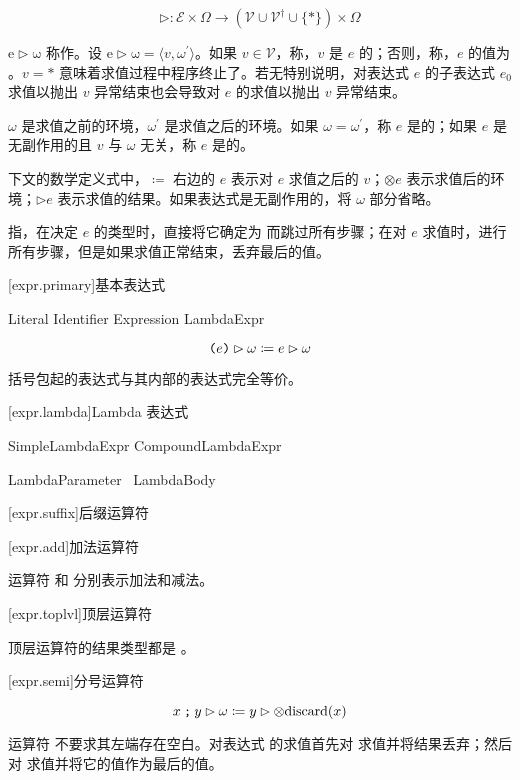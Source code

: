 $$ \mathrm{\rhd}: \mathcal{E} \times \Omega \rightarrow (\mathcal{V} \cup \mathcal{V}^\dag \cup \{\ast\}) \times \Omega $$

\pnum
$\mathrm{e \rhd \omega}$ 称作。设 $\mathrm{e \rhd \omega} = \langle v, \omega^\prime \rangle$。如果 $v \in \mathcal{V}$，称，$v$ 是 $e$ 的；否则，称，$e$ 的值为 。$v = \ast$ 意味着求值过程中程序终止了。若无特别说明，对表达式 $e$ 的子表达式 $e_0$ 求值以抛出 $v$ 异常结束也会导致对 $e$ 的求值以抛出 $v$ 异常结束。

\pnum
$\omega$ 是求值之前的环境，$\omega^\prime$ 是求值之后的环境。如果 $\omega = \omega^\prime$，称 $e$ 是的；如果 $e$ 是无副作用的且 $v$ 与 $\omega$ 无关，称 $e$ 是的。

\pnum
下文的数学定义式中，$\coloneqq$ 右边的 $e$ 表示对 $e$ 求值之后的 $v$；$\otimes e$ 表示求值后的环境；$\rhd e$ 表示求值的结果。如果表达式是无副作用的，将 $\omega$ 部分省略。

\pnum
{}指，在决定 $e$ 的类型时，直接将它确定为  而跳过所有步骤；在对 $e$ 求值时，进行所有步骤，但是如果求值正常结束，丢弃最后的值。

[expr.primary]{基本表达式}

\begin{bnf}
 \br
    Literal \br
    Identifier \br
    \terminal{(} Expression \terminal{)} \br
    LambdaExpr
\end{bnf}

$$ \texttt{(}e\texttt{)} \rhd \omega \coloneqq e \rhd \omega $$

\pnum
括号包起的表达式与其内部的表达式完全等价。

[expr.lambda]{Lambda 表达式}

\begin{bnf}
 \br
    SimpleLambdaExpr \br
    CompoundLambdaExpr
\end{bnf}

\begin{bnf}
 \br
    LambdaParameter\bnfq\ \terminal{=>} LambdaBody
\end{bnf}

\begin{bnf}
 \br
\end{bnf}

[expr.suffix]{后缀运算符}

[expr.add]{加法运算符}

\pnum
运算符 \tcode{+} 和 \tcode{-} 分别表示加法和减法。

[expr.toplvl]{顶层运算符}

\pnum
顶层运算符的结果类型都是 。

[expr.semi]{分号运算符}

$$ x \mathbin{\texttt{;}} y \rhd \omega \coloneqq y \rhd \otimes \mathrm{discard}(x)$$

\pnum
运算符 \tcode{;} 不要求其左端存在空白。对表达式  的求值首先对  求值并将结果丢弃；然后对  求值并将它的值作为最后的值。
